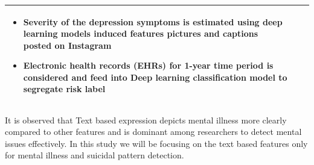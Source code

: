 \documentclass[sn-mathphys,Numbered]{sn-jnl}%
\theoremstyle{thmstyleone}%
\theoremstyle{thmstyletwo}%
\theoremstyle{thmstylethree}%
\begin{document}
\begin{table}[h!]
\begin{center}
\begin{flushleft}
\begin{tabular}{|p{2cm}|p{2cm}|p{8cm}|}
\begin{itemize}
\item Severity of the depression symptoms is estimated using deep learning models induced features pictures and captions posted on Instagram \cite{mann2020see}
\item Electronic health records (EHRs) for 1-year time period is considered  and feed into Deep learning classification model to segregate risk label \cite{zheng2020development}
\end{itemize}
 \\
%
\bottomrule
\end{tabular}
\end{flushleft}
\end{center}
\end{table}
It is observed that Text based expression depicts mental illness more clearly compared to other features and is dominant among researchers to detect mental issues effectively. In this study we will be focusing on the text based features only for mental illness and suicidal pattern detection. 
\end{document}

